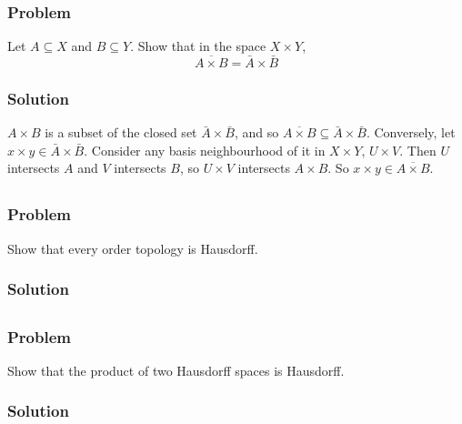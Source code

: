 \subsubsection{Problem}
Let $A \subseteq X$ and $B \subseteq Y$. Show that in the space $X \times Y$,
\[\overline{A \times B} = \bar A \times \bar B \]
\subsubsection{Solution}
$A \times B$ is a subset of the closed set $\bar A \times \bar B$, and so $\overline{A \times B} \subseteq \bar A \times \bar B$. Conversely, let $x \times y \in \bar A \times \bar B$. Consider any basis neighbourhood of it in $X \times Y$, $U \times V$. Then $U$ intersects $A$ and $V$ intersects $B$, so $U \times V$ intersects $A \times B$. So $x \times y \in \overline{A \times B}$. 


\subsection{}

\subsubsection{Problem}
Show that every order topology is Hausdorff.
\subsubsection{Solution}
\todo


\subsection{}

\subsubsection{Problem}
Show that the product of two Hausdorff spaces is Hausdorff.
\subsubsection{Solution}
\todo


\subsection{}

